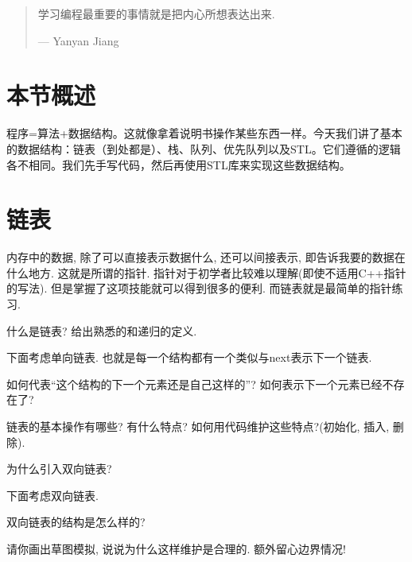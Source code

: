 \documentclass{ctexart}
\begin{document}

\begin{quote}
    学习编程最重要的事情就是把内心所想表达出来. 

    \hfill --- Yanyan Jiang
\end{quote}

\section{本节概述}

程序=算法+数据结构。这就像拿着说明书操作某些东西一样。今天我们讲了基本的数据结构：链表（到处都是）、栈、队列、优先队列以及STL。它们遵循的逻辑各不相同。我们先手写代码，然后再使用STL库来实现这些数据结构。

\section{链表} 

内存中的数据, 除了可以直接表示数据什么, 还可以间接表示, 即告诉我要的数据在什么地方. 这就是所谓的指针. 指针对于初学者比较难以理解(即使不适用C++指针的写法). 但是掌握了这项技能就可以得到很多的便利. 而链表就是最简单的指针练习. 

\begin{exc} 什么是链表? 给出熟悉的和递归的定义. 
\end{exc}

下面考虑单向链表. 也就是每一个结构都有一个类似与next表示下一个链表. 

\begin{exc}
    如何代表``这个结构的下一个元素还是自己这样的''? 如何表示下一个元素已经不存在了? 
\end{exc}

\begin{exc}
    链表的基本操作有哪些? 有什么特点? 如何用代码维护这些特点?(初始化, 插入, 删除).
\end{exc}

\begin{exc}
    为什么引入双向链表? 
\end{exc}

下面考虑双向链表. 

\begin{exc}
    双向链表的结构是怎么样的?
\end{exc}

\begin{exc}
    请你画出草图模拟, 说说为什么这样维护是合理的. 额外留心边界情况!
\end{exc}
\end{document}
